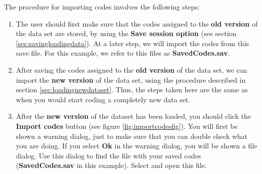 \documentclass{memoir}
\begin{document}
The procedure for importing codes involves the following steps:
\begin{enumerate}
\item{The user should first make sure that the codes assigned to the \textbf{old version} of the data set are stored, by using the \textbf{Save session option} (see section \ref{sec:savingloadingdata}). At a later step, we will import the codes from this save file. For this example, we refer to this files as \textbf{Saved\textunderscore Codes.sav}.}
\item{After saving the codes assigned to the \textbf{old version} of the data set, we can import the \textbf{new version} of the data set, using the procedure described in section \ref{sec:loadingnewdataset}. Thus, the steps taken here are the same as when you would start coding a completely new data set.}
\item{After the \textbf{new version} of the dataset has been loaded, you should click the \textbf{Import codes} button (see figure \ref{fig:importcodesfig}). You will first be shown a warning dialog, just to make sure that you can double check what you are doing. If you select \textbf{Ok} in the warning dialog, you will be shown a file dialog. Use this dialog to find the file with your saved codes (\textbf{Saved\textunderscore Codes.sav} in this example). Select and open this file.}

\end{enumerate}
\end{document}
